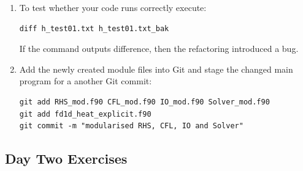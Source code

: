 \documentclass[12pt]{article}
\begin{document}
\begin{enumerate}
\item To test whether your code runs correctly execute:
\begin{verbatim}
diff h_test01.txt h_test01.txt_bak
\end{verbatim}
If the command outputs difference, then the refactoring introduced a bug.
\item Add the newly created module files into Git and stage the changed main program for a
another Git commit:
\begin{verbatim}
git add RHS_mod.f90 CFL_mod.f90 IO_mod.f90 Solver_mod.f90
git add fd1d_heat_explicit.f90
git commit -m "modularised RHS, CFL, IO and Solver"
\end{verbatim}
%
\end{enumerate}
\newpage
\subsection*{Day Two Exercises}
\end{document}
